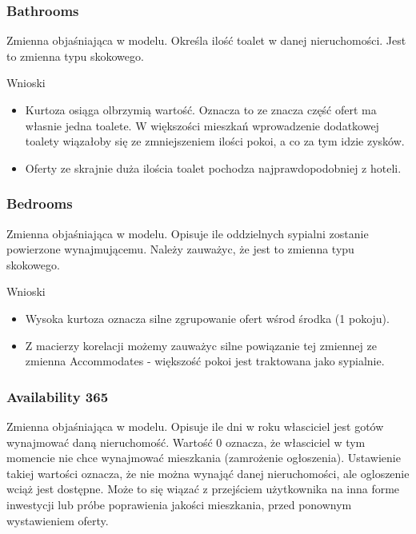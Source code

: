 \subsubsection{Bathrooms}\label{subsubsec:bathrooms}
Zmienna objaśniająca w modelu.
Określa ilość toalet w danej nieruchomości.
Jest to zmienna typu skokowego.



Wnioski

\begin{itemize}
    \item Kurtoza osiąga olbrzymią wartość.
    Oznacza to ze znacza część ofert ma własnie jedna toalete.
    W większości mieszkań wprowadzenie dodatkowej toalety wiązałoby się ze zmniejszeniem ilości pokoi, a co za tym idzie zysków.
    \item Oferty ze skrajnie duża ilościa toalet pochodza najprawdopodobniej z hoteli.
\end{itemize}

\subsubsection{Bedrooms}\label{subsubsec:bedrooms}
Zmienna objaśniająca w modelu.
Opisuje ile oddzielnych sypialni zostanie powierzone wynajmującemu.
Należy zauważyc, że jest to zmienna typu skokowego.



Wnioski

\begin{itemize}
    \item Wysoka kurtoza oznacza silne zgrupowanie ofert wśrod środka (1 pokoju).
    \item Z macierzy korelacji możemy zauważyc silne powiązanie tej zmiennej ze zmienna Accommodates - większość pokoi jest traktowana jako sypialnie.
\end{itemize}

\subsubsection{Availability 365}\label{subsubsec:availability-365}
Zmienna objaśniająca w modelu.
Opisuje ile dni w roku własciciel jest gotów wynajmować daną nieruchomość.
Wartość 0 oznacza, że własciciel w tym momencie nie chce wynajmować mieszkania (zamrożenie ogłoszenia).
Ustawienie takiej wartości oznacza, że nie można wynająć danej nieruchomości, ale ogloszenie wciąż jest dostępne.
Może to się wiązać z przejściem użytkownika na inna forme inwestycji lub próbe poprawienia jakości mieszkania, przed ponownym wystawieniem oferty.

